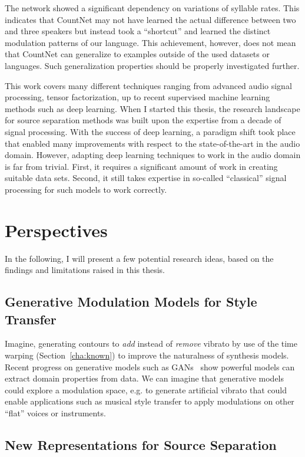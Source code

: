 The network showed a significant dependency on variations of syllable rates. This indicates that CountNet may not have learned the actual difference between two and three speakers but instead took a ``shortcut'' and learned the distinct modulation patterns of our language.
This achievement, however, does not mean that CountNet can generalize to examples outside of the used datasets or languages. Such generalization properties should be properly investigated further.
\par
This work covers many different techniques ranging from advanced audio signal processing, tensor factorization, up to recent supervised machine learning methods such as deep learning.
When I started this thesis, the research landscape for source separation methods was built upon the expertise from a decade of signal processing.
With the success of deep learning, a paradigm shift took place that enabled many improvements with respect to the state-of-the-art in the audio domain. However, adapting deep learning techniques to work in the audio domain is far from trivial. First, it requires a significant amount of work in creating suitable data sets. Second, it still takes expertise in so-called ``classical'' signal processing for such models to work correctly.

\section{Perspectives}

In the following, I will present a few potential research ideas, based on the findings and limitations raised in this thesis.

\subsection*{Generative Modulation Models for Style Transfer}
Imagine, generating contours to \emph{add} instead of \emph{remove} vibrato by use of the time warping (Section~\ref{cha:known}) to improve the naturalness of synthesis models.
Recent progress on generative models such as GANs~\cite{goodfellow14} show powerful models can extract domain properties from data.
We can imagine that generative models could explore a modulation space, e.g. to generate artificial vibrato that could enable applications such as musical style transfer to apply modulations on other ``flat'' voices or instruments.

\subsection*{New Representations for Source Separation}

